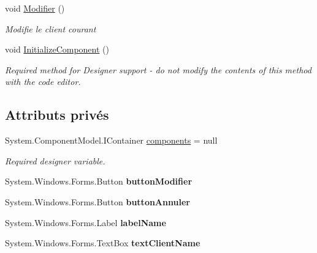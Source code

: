\begin{DoxyCompactItemize}
void \mbox{\hyperlink{class_m_t_connect_agent_1_1_form_modifie_client_a3afd18ad3968998f66567dad318a17f9}{Modifier}} ()
\begin{DoxyCompactList}\small\item\em Modifie le client courant \end{DoxyCompactList}\item 
void \mbox{\hyperlink{class_m_t_connect_agent_1_1_form_modifie_client_abf0bb8649ca1a2917984ee61f9c590e5}{Initialize\+Component}} ()
\begin{DoxyCompactList}\small\item\em Required method for Designer support -\/ do not modify the contents of this method with the code editor. \end{DoxyCompactList}\end{DoxyCompactItemize}
\subsection*{Attributs privés}
\begin{DoxyCompactItemize}
\item 
System.\+Component\+Model.\+I\+Container \mbox{\hyperlink{class_m_t_connect_agent_1_1_form_modifie_client_a684d0e616a4b30c46123a53b83f68b24}{components}} = null
\begin{DoxyCompactList}\small\item\em Required designer variable. \end{DoxyCompactList}\item 
\mbox{\label{class_m_t_connect_agent_1_1_form_modifie_client_a9bdaacfb53e85e0dde6835de9e7722bf}} 
System.\+Windows.\+Forms.\+Button {\bfseries button\+Modifier}
\item 
\mbox{\label{class_m_t_connect_agent_1_1_form_modifie_client_a116bef14cd02d536e7f34fc0610f96e7}} 
System.\+Windows.\+Forms.\+Button {\bfseries button\+Annuler}
\item 
\mbox{\label{class_m_t_connect_agent_1_1_form_modifie_client_a3ce819cd742694c37aed4ff866535f23}} 
System.\+Windows.\+Forms.\+Label {\bfseries label\+Name}
\item 
\mbox{\label{class_m_t_connect_agent_1_1_form_modifie_client_ab476b3c44de6e7a73bcb78dc1b5a1ae6}} 
System.\+Windows.\+Forms.\+Text\+Box {\bfseries text\+Client\+Name}
\end{DoxyCompactItemize}


